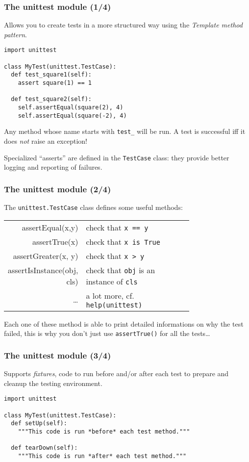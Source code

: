 \documentclass[english,serif,mathserif,xcolor=pdftex,dvipsnames,table]{beamer}
\begin{document}
\begin{frame}[fragile]
  \frametitle{The unittest module (1/4)}
  Allows you to create tests in a more structured way using the
  \textit{Template method pattern}.

  \begin{lstlisting}
import unittest

class MyTest(unittest.TestCase):
  def test_square1(self):
    assert square(1) == 1

  def test_square2(self):
    self.assertEqual(square(2), 4)
    self.assertEqual(square(-2), 4)
  \end{lstlisting}

Any method whose name starts with \lstinline|test_| will be run.
A test is successful iff it does \emph{not} raise an exception!

\+
Specialized ``asserts'' are defined in the \lstinline|TestCase|
class: they provide better logging and reporting of failures.
\end{frame}


\begin{frame}[fragile]
  \frametitle{The unittest module (2/4)}

  The \lstinline|unittest.TestCase| class defines some useful methods:
  \begin{tabular}{>{\scriptsize\ttfamily}rp{0.75\linewidth}}
  assertEqual(x,y)           & check that \texttt{x == y} \\
  assertTrue(x)              & check that \texttt{x is True} \\
  assertGreater(x, y)        & check that \texttt{x > y} \\
  assertIsInstance(obj, cls) & check that \texttt{obj} is an instance of \texttt{cls} \\
  \ldots                     & a lot more, cf. \texttt{help(unittest)}
  \end{tabular}

  \+
  Each one of these method is able to print detailed informations on
  why the test failed, this is why you don't just use
  \texttt{assertTrue()} for all the tests\ldots
\end{frame}


\begin{frame}[fragile]
  \frametitle{The unittest module (3/4)}
  Supports \textit{fixtures}, code to run before and/or after each
  test to prepare and cleanup the testing environment.

  \+
  \begin{lstlisting}
import unittest

class MyTest(unittest.TestCase):
  def setUp(self):
    """This code is run *before* each test method."""

  def tearDown(self):
    """This code is run *after* each test method."""
  \end{lstlisting}
\end{frame}
\end{document}
